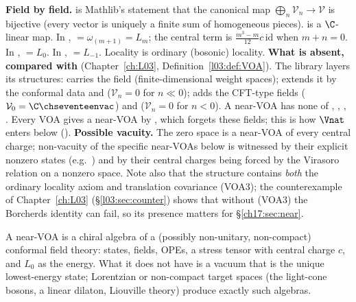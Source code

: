 \begin{dictionary}
\textbf{Field by field.}  is Mathlib's statement that the canonical map
$\bigoplus_n\mathcal V_n\to\mathcal V$ is bijective (every vector is uniquely a finite sum of homogeneous
pieces).   is a $\C$-linear map.  In , 
$=\omega_{(m+1)}=L_m$; the central term is $\frac{m^3-m}{12}c\,\mathrm{id}$ when $m+n=0$.  In
,  $=L_0$.  In ,
 $=L_{-1}$.  Locality is ordinary (bosonic) locality.
\textbf{What is absent, compared with } (Chapter~\ref{ch:L03},
Definition~\ref{l03:def:VOA}).  The library layers its structures:  carries the field
 (finite-dimensional weight spaces);  extends it by the
conformal data and  ($\mathcal V_n=0$ for $n\ll0$); 
adds the CFT-type fields  ($\mathcal V_0=\C\chseventeenvac$) and 
($\mathcal V_n=0$ for $n<0$).  A near-VOA has none of , ,
, .
Every VOA gives a near-VOA by , which forgets these fields; this is
how $\Vnat$ enters below ().
\textbf{Possible vacuity.} The zero space is a near-VOA of every central charge; non-vacuity of the specific
near-VOAs below is witnessed by their explicit nonzero states (e.g.\ ) and
by their central charges being forced by the Virasoro relation on a nonzero space.  Note also that the
structure contains \emph{both} the ordinary locality axiom and translation covariance (VOA3); the counterexample
of Chapter~\ref{ch:L03} (\S\ref{l03:sec:counter}) shows that without (VOA3) the Borcherds identity can fail, so
its presence matters for \S\ref{ch17:sec:near}.
\end{dictionary}

\begin{physics}
A near-VOA is a chiral algebra of a (possibly non-unitary, non-compact) conformal field theory: states,
fields, OPEs, a stress tensor with central charge $c$, and $L_0$ as the energy.  What it does not have is a
vacuum that is the unique lowest-energy state; Lorentzian or non-compact target spaces (the light-cone
bosons, a linear dilaton, Liouville theory) produce exactly such algebras.
\end{physics}


